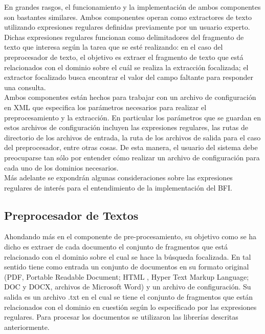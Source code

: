En grandes rasgos, el funcionamiento y la implementación de ambos componentes son bastantes similares. Ambos componentes operan como extractores de texto utilizando expresiones regulares definidas previamente por un usuario experto. Dichas expresiones regulares funcionan como delimitadores del fragmento de texto que interesa según la tarea que se esté realizando: en el caso del preprocesador de texto, el objetivo es extraer el fragmento de texto que está relacionados con el dominio sobre el cuál se realiza la extracción focalizada; el extractor focalizado busca encontrar el valor del campo faltante para responder una consulta. \\

Ambos componentes están hechos para trabajar con un archivo de configuración en XML que especifica los parámetros necesarios para realizar el preprocesamiento y la extracción. En particular los parámetros que se guardan en estos archivos de configuración incluyen las expresiones regulares, las rutas de directorio de los archivos de entrada, la ruta de los archivos de salida para el caso del preprocesador, entre otras cosas. De esta manera, el usuario del sistema debe preocuparse tan sólo por entender cómo realizar un archivo de configuración para cada uno de los dominios necesarios. \\

Más adelante se expondrán algunas consideraciones sobre las expresiones regulares de interés para el entendimiento de la implementación del BFI. \\

\subsection{Preprocesador de Textos}\label{sect:implementacion-preProcesador}

Ahondando más en el componente de pre-procesamiento, su objetivo como se ha dicho es extraer de cada documento el conjunto de fragmentos que está relacionado con el dominio sobre el cual se hace la búsqueda focalizada. En tal sentido tiene como entrada un conjunto de documentos en su formato original (PDF, Portable Readable Document; HTML , Hyper Text Markup Language; DOC y DOCX, archivos de Microsoft Word) y un archivo de configuración. Su salida es un archivo .txt en el cual se tiene el conjunto de fragmentos que están relacionados con el dominio en cuestión según lo especificado por las expresiones regulares. Para procesar los documentos se utilizaron las librerías descritas anteriormente. \\

